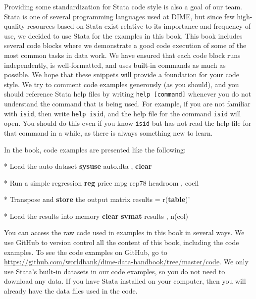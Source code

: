 \documentclass[
]{book}
\newenvironment{Shaded}{\begin{snugshade}}{\end{snugshade}}
\newcommand{\DecValTok}[1]{\textcolor[rgb]{0.00,0.00,0.81}{#1}}
\newcommand{\FunctionTok}[1]{\textcolor[rgb]{0.00,0.00,0.00}{#1}}
\newcommand{\KeywordTok}[1]{\textcolor[rgb]{0.13,0.29,0.53}{\textbf{#1}}}
\newcommand{\NormalTok}[1]{#1}
\begin{document}
Providing some standardization for Stata code style
is also a goal of our team.
Stata is one of several programming languages used at DIME,
but since few high-quality resources based on Stata exist
relative to its importance and frequency of use,
we decided to use Stata for the examples in this book.
This book includes several code blocks
where we demonstrate a good code execution
of some of the most common tasks in data work.
We have ensured that each code block runs independently,
is well-formatted,
and uses built-in commands as much as possible.
We hope that these snippets will provide a foundation for your code style.
We try to comment code examples generously (as you should),
and you should reference Stata help files by writing \texttt{help\ {[}command{]}}
whenever you do not understand the command that is being used.
For example, if you are not familiar with \texttt{isid},
then write \texttt{help\ isid},
and the help file for the command \texttt{isid} will open.
You should do this even if you know \texttt{isid}
but has not read the help file for that command in a while,
as there is always something new to learn.

In the book, code examples are presented like the following:

\begin{Shaded}
\begin{Highlighting}[numbers=left,,]
\NormalTok{* Load the auto dataset}
    \KeywordTok{sysuse}\NormalTok{ auto.dta , }\KeywordTok{clear}

\NormalTok{* Run a simple regression}
    \KeywordTok{reg}\NormalTok{ price mpg rep78 headroom , coefl}

\NormalTok{* Transpose and }\KeywordTok{store}\NormalTok{ the output}
    \FunctionTok{matrix}\NormalTok{ results = }\FunctionTok{r}\NormalTok{(}\KeywordTok{table}\NormalTok{)'}

\NormalTok{* Load the results into }\DecValTok{memory}
    \KeywordTok{clear}
    \KeywordTok{svmat}\NormalTok{ results , n(col)}
\end{Highlighting}
\end{Shaded}

You can access the raw code used in examples in this book in several ways.
We use GitHub to version control all the content of this book,
including the code examples.
To see the code examples on GitHub, go to
\url{https://github.com/worldbank/dime-data-handbook/tree/master/code}.
We only use Stata's built-in datasets in our code examples,
so you do not need to download any data.
If you have Stata installed on your computer,
then you will already have the data files used in the code.
\end{document}
